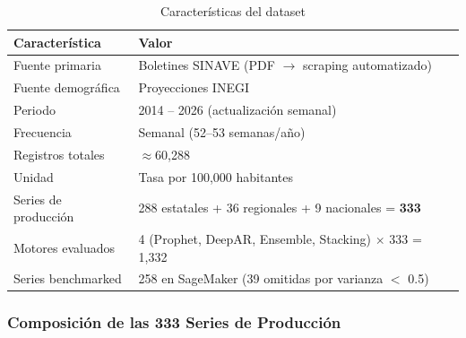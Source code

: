 \documentclass[12pt, letterpaper]{article}
\begin{document}
\begin{table}[H]
\centering
\caption{Características del dataset}
\label{tab:dataset}
\scriptsize
\setlength{\tabcolsep}{4pt}
\begin{tabular}{ll}
\toprule
\textbf{Característica} & \textbf{Valor} \\
\midrule
Fuente primaria        & Boletines SINAVE (PDF $\to$ scraping automatizado) \\
Fuente demográfica     & Proyecciones INEGI \\
Periodo                & 2014 -- 2026 (actualización semanal) \\
Frecuencia             & Semanal (52--53 semanas/año) \\
Registros totales      & $\approx$60,288 \\
Unidad                 & Tasa por 100,000 habitantes \\
Series de producción   & 288 estatales + 36 regionales + 9 nacionales = \textbf{333} \\
Motores evaluados      & 4 (Prophet, DeepAR, Ensemble, Stacking) $\times$ 333 = 1,332 \\
Series benchmarked     & 258 en SageMaker (39 omitidas por varianza $<$ 0.5) \\
\bottomrule
\end{tabular}
\end{table}

%
%
%
%



\subsubsection*{Composición de las 333 Series de Producción}
\end{document}
